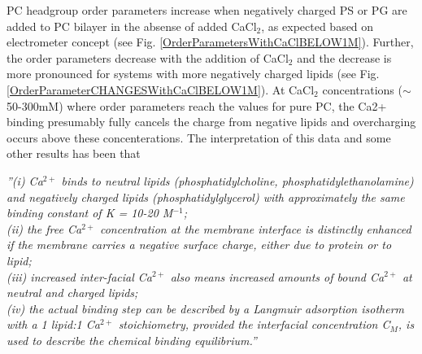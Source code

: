 \documentclass[aps,prl,superscriptaddress,twocolumn]{revtex4}
\begin{document}
PC headgroup order parameters increase when negatively charged
PS or PG are added to PC bilayer in the absense of added CaCl$_2$,
as expected based on electrometer concept \cite{seelig87}
(see Fig. \ref{OrderParametersWithCaClBELOW1M}).
Further, the order parameters decrease with the addition
of CaCl$_2$ and the decrease is more pronounced for systems with more
negatively charged lipids (see Fig. \ref{OrderParameterCHANGESWithCaClBELOW1M}).
At CaCl$_2$ concentrations ($\sim$ 50-300mM) where order parameters reach the values for pure PC,
the Ca2+ binding presumably fully cancels the charge from negative lipids and
overcharging occurs above these concenterations.
The interpretation of this data and some other results has been that \cite{seelig90}
\begin{displayquote}
  {\it ''(i) Ca$^{2+}$ binds to neutral lipids (phosphatidylcholine, phosphatidylethanolamine) and negatively charged lipids
    (phosphatidylglycerol) with approximately the same binding constant of K = 10-20 M$^{-1}$; \\
    (ii) the free Ca$^{2+}$
    concentration at the membrane interface is distinctly enhanced if the membrane carries a negative surface
    charge, either due to protein or to lipid; \\
    (iii) increased inter-facial Ca$^{2+}$ also means increased amounts
    of bound Ca$^{2+}$ at neutral and charged lipids; \\
    (iv) the actual binding step can be described by a Langmuir
    adsorption isotherm with a 1 lipid:1 Ca$^{2+}$ stoichiometry, provided the interfacial concentration C$_M$, is
    used to describe the chemical binding equilibrium.''}
\end{displayquote}
\end{document}
